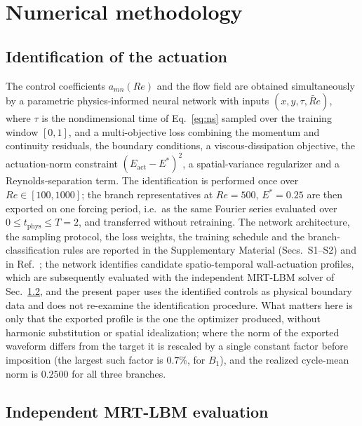 \documentclass[11pt,a4paper]{article}
\newcommand{\Eact}{E_{\mathrm{act}}}
\begin{document}
\section{Numerical methodology}
\label{sec:methods}

\subsection{Identification of the actuation}

The control coefficients $a_{mn}(Re)$ and the flow field are obtained simultaneously
by a parametric physics-informed neural network \cite{raissi2019pinn,cai2021pinnreview}
with inputs $(x,y,\tau,\widetilde{Re})$, where
$\tau$ is the nondimensional time of Eq.~\eqref{eq:ns} sampled over the training
window $[0,1]$,
and a multi-objective loss combining the momentum and continuity residuals, the
boundary conditions, a viscous-dissipation objective, the actuation-norm
constraint $(\Eact-E^\ast)^2$, a spatial-variance regularizer and a
Reynolds-separation term. The identification is performed once over
$Re\in[100,1000]$; the branch representatives at $Re=500$, $E^\ast=0.25$ are then
exported on one forcing period, i.e.\ as the same Fourier series evaluated over
$0\le t_{\mathrm{phys}}\le T=2$, and transferred without retraining. The network
architecture, the sampling protocol, the loss weights, the training schedule and
the branch-classification rules are reported in the Supplementary Material
(Secs.~S1--S2) and in Ref.~\cite{beniaiche2026}; the network identifies candidate
spatio-temporal wall-actuation profiles, which are subsequently evaluated with the
independent MRT-LBM solver of Sec.~\ref{sec:lbm}, and the present paper uses the
identified controls as physical boundary data and does not re-examine the
identification procedure. What matters here is only that the exported profile is
the one the optimizer produced, without harmonic substitution or spatial
idealization; where the norm of the exported waveform differs from the target it
is rescaled by a single constant factor before imposition (the largest such
factor is $0.7\%$, for $B_1$), and the realized cycle-mean norm is $0.2500$ for
all three branches.

\subsection{Independent MRT-LBM evaluation}
\label{sec:lbm}
\end{document}
